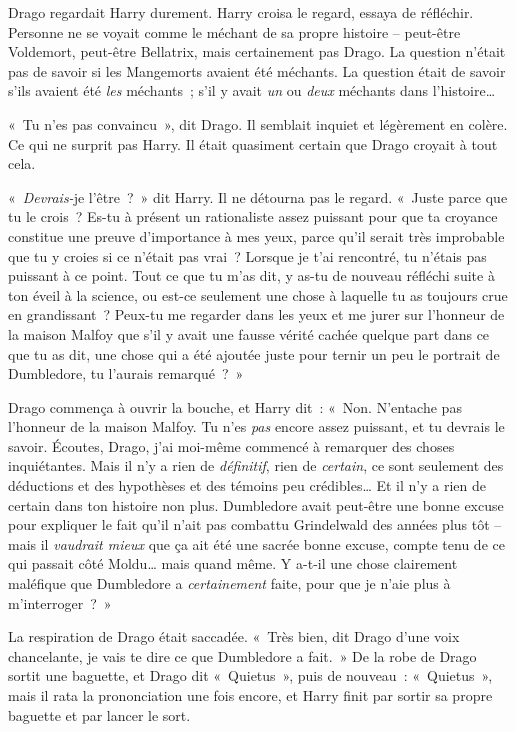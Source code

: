 Drago regardait Harry durement. Harry croisa le regard, essaya de réfléchir. Personne ne se voyait comme le méchant de sa propre histoire -- peut-être Voldemort, peut-être Bellatrix, mais certainement pas Drago. La question n'était pas de savoir si les Mangemorts avaient été méchants. La question était de savoir s'ils avaient été \emph{les} méchants~; s'il y avait \emph{un} ou \emph{deux} méchants dans l'histoire…

«~Tu n'es pas convaincu~», dit Drago. Il semblait inquiet et légèrement en colère. Ce qui ne surprit pas Harry. Il était quasiment certain que Drago croyait à tout cela.

«~\emph{Devrais-}je l'être~?~» dit Harry. Il ne détourna pas le regard. «~Juste parce que tu le crois~? Es-tu à présent un rationaliste assez puissant pour que ta croyance constitue une preuve d'importance à mes yeux, parce qu'il serait très improbable que tu y croies si ce n'était pas vrai~? Lorsque je t'ai rencontré, tu n'étais pas puissant à ce point. Tout ce que tu m'as dit, y as-tu de nouveau réfléchi suite à ton éveil à la science, ou est-ce seulement une chose à laquelle tu as toujours crue en grandissant~? Peux-tu me regarder dans les yeux et me jurer sur l'honneur de la maison Malfoy que s'il y avait une fausse vérité cachée quelque part dans ce que tu as dit, une chose qui a été ajoutée juste pour ternir un peu le portrait de Dumbledore, tu l'aurais remarqué~?~»

Drago commença à ouvrir la bouche, et Harry dit~: «~Non. N'entache pas l'honneur de la maison Malfoy. Tu n'es \emph{pas} encore assez puissant, et tu devrais le savoir. Écoutes, Drago, j'ai moi-même commencé à remarquer des choses inquiétantes. Mais il n'y a rien de \emph{définitif}, rien de \emph{certain}, ce sont seulement des déductions et des hypothèses et des témoins peu crédibles… Et il n'y a rien de certain dans ton histoire non plus. Dumbledore avait peut-être une bonne excuse pour expliquer le fait qu'il n'ait pas combattu Grindelwald des années plus tôt -- mais il \emph{vaudrait mieux} que ça ait été une sacrée bonne excuse, compte tenu de ce qui passait côté Moldu… mais quand même. Y a-t-il une chose clairement maléfique que Dumbledore a \emph{certainement} faite, pour que je n'aie plus à m'interroger~?~»

La respiration de Drago était saccadée. «~Très bien, dit Drago d'une voix chancelante, je vais te dire ce que Dumbledore a fait.~» De la robe de Drago sortit une baguette, et Drago dit «~Quietus~», puis de nouveau~: «~Quietus~», mais il rata la prononciation une fois encore, et Harry finit par sortir sa propre baguette et par lancer le sort.

